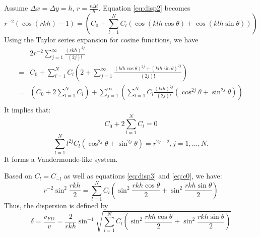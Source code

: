 Assume $\Delta x=\Delta y=h$, $r=\frac{v\Delta t}{h}$. Equation \eqref{eq:disp2} becomes
\begin{equation}\label{eq:disp3}
 r^{-2}( \cos (r kh)-1)
=\left(C_0+\sum_{l=1}^{N}C_l (\cos(klh\cos\theta)+\cos(klh\sin\theta))\right)
\end{equation}
Using the Taylor series expansion for cosine functions, we have
\begin{equation}
\begin{split}
 &2r^{-2}\sum_{j=1}^{\infty}\frac{(rkh)^{2j}}{(2j)!}\\
 =&C_0+\sum_{l=1}^{N}C_l \left(2+\sum_{j=1}^{\infty}\frac{(klh\cos\theta)^{2j}+(klh\sin\theta)^{2j}}{(2j)!}\right)\\
 =&\left(C_0+2\sum_{l=1}^{N}C_l\right)+
 \sum_{j=1}^{\infty} \left(\sum_{l=1}^{N}C_l\frac{(klh)^{2j}}{(2j)!}(\cos^{2j}\theta+\sin^{2j}\theta)\right)\\
\end{split}
\end{equation}
It implies that:
\begin{equation}\label{eq:c0}
 C_0+2\sum_{l=1}^{N}C_l=0
\end{equation}
\begin{equation}
 \sum_{l=1}^{N}l^{2j}C_l(\cos^{2j}\theta+\sin^{2j}\theta)=r^{2j-2}, j=1, \ldots, N.
\end{equation}
It forms a Vandermonde-like system.

Based on $C_l=C_{-l}$ as well as equations \eqref{eq:disp3} and \eqref{eq:c0}, we have:
\begin{equation}
 r^{-2}\sin^2\frac{rkh}{2}=\sum_{l=1}^N C_l \left(
 \sin^2\frac{rkh\cos\theta}{2}+\sin^2\frac{rkh\sin\theta}{2} \right)
\end{equation}
Thus, the dispersion is defined by
\begin{equation}
 \delta=\frac{v_{FD}}{v}=\frac{2}{rkh}\sin^{-1}\sqrt{\sum_{l=1}^N C_l \left(
 \sin^2\frac{rkh\cos\theta}{2}+\sin^2\frac{rkh\sin\theta}{2} \right)}
\end{equation}



